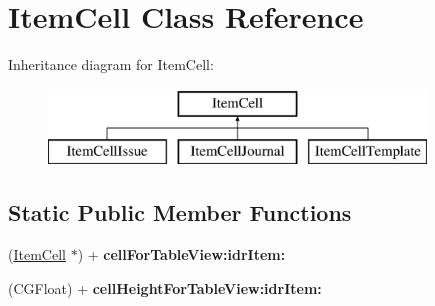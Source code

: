 \hypertarget{interface_item_cell}{
\section{ItemCell Class Reference}
\label{interface_item_cell}
}
Inheritance diagram for ItemCell:\begin{figure}[H]
\begin{center}
\leavevmode
\includegraphics[height=2.000000cm]{interface_item_cell}
\end{center}
\end{figure}
\subsection*{Static Public Member Functions}
\begin{DoxyCompactItemize}
\item 
\hypertarget{interface_item_cell_a0ff61002477e3a4cc173db25e52ff0dc}{
(\hyperlink{interface_item_cell}{ItemCell} $\ast$) + {\bfseries cellForTableView:idrItem:}}
\label{interface_item_cell_a0ff61002477e3a4cc173db25e52ff0dc}

\item 
\hypertarget{interface_item_cell_ad11f2bc4ab5859a37aefd90e1b91431a}{
(CGFloat) + {\bfseries cellHeightForTableView:idrItem:}}
\label{interface_item_cell_ad11f2bc4ab5859a37aefd90e1b91431a}

\end{DoxyCompactItemize}
